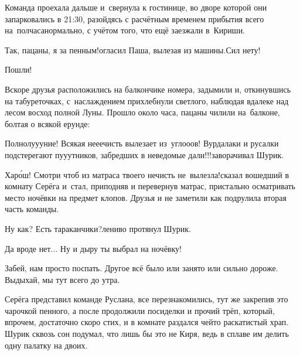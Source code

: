 Команда проехала дальше и~свернула к гостинице, во дворе которой они запарковались в 21:30, разойдясь с расчётным временем прибытия всего на~полчаса\mdash нормально, с учётом того, что ещё заезжали в~Кириши.

\diagdash Так, пацаны, я за пенным!\mdash огласил Паша, вылезая из машины.\mdash Сил нету!

\diagdash Пошли!

Вскоре друзья расположились на балкончике номера, задымили и, откинувшись на табуреточках, с~наслаждением прихлебнули светлого, наблюдая вдалеке над лесом восход полной Луны. Прошло около часа, пацаны чилили на~балконе, болтая о всякой ерунде:

\diagdash Полнолу\sdash у\sdash уние! Всякая не\sdash е\sdash ечисть вылезает из~угло\sdash о\sdash ов! Вурдалаки и русалки подстерегают пу\sdash у\sdash утников, забредших в неведомые дали!!!\mdash заворачивал Шурик.

\diagdash Хар\'{о}ш! Смотри чтоб из матраса твоего нечисть не~вылезла!\mdash сказал вошедший в комнату Серёга и~стал, приподняв и перевернув матрас, пристально осматривать место ночёвки на предмет клопов. Друзья и не заметили как подрулила вторая часть команды.

\diagdash Ну как? Есть тараканчики?\mdash лениво протянул Шурик.

\diagdash Да вроде нет$\ldots$ Ну и дыру ты выбрал на ночёвку! 

\diagdash Забей, нам просто поспать. Другое всё было или занято или сильно дороже. Выдыхай, мы тут всего до утра.

Серёга представил команде Руслана, все перезнакомились, тут же закрепив это чарочкой пенного, а после продолжили посиделки и прочий трёп, который, впрочем, достаточно скоро стих, и в комнате раздался чей\sdash то раскатистый храп. Шурик сквозь сон подумал, что лишь бы это не Киря, ведь в сплаве им делить одну палатку на двоих.

\begin{center}
\end{center}